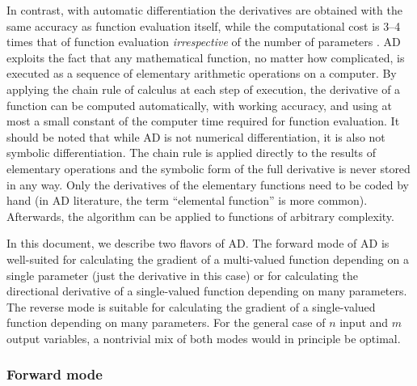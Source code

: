 \documentclass{article}
\begin{document}
In contrast, with automatic differentiation the derivatives are obtained with the same accuracy as function evaluation itself, while the computational cost is 3--4 times that of function evaluation \textit{irrespective} of the number of parameters \cite{griewank08}. AD exploits the fact that any mathematical function, no matter how complicated, is executed as a sequence of elementary arithmetic operations on a computer. By applying the chain rule of calculus at each step of execution, the derivative of a function can be computed automatically, with working accuracy, and using at most a small constant of the computer time required for function evaluation. It should be noted that while AD is not numerical differentiation, it is also not symbolic differentiation. The chain rule is applied directly to the results of elementary operations and the symbolic form of the full derivative is never stored in any way. Only the derivatives of the elementary functions need to be coded by hand (in AD literature, the term ``elemental function'' is more common). Afterwards, the algorithm can be applied to functions of arbitrary complexity.

In this document, we describe two flavors of AD. The forward mode of AD is well-suited for calculating the gradient of a multi-valued function depending on a single parameter (just the derivative in this case) or for calculating the directional derivative of a single-valued function depending on many parameters. The reverse mode is suitable for calculating the gradient of a single-valued function depending on many parameters. For the general case of $n$ input and $m$ output variables, a nontrivial mix of both modes would in principle be optimal.

\subsubsection{Forward mode}
\end{document}

